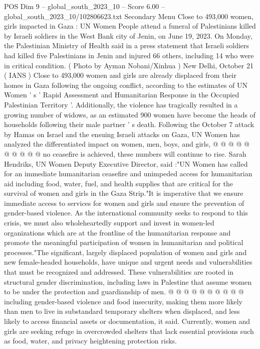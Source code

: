 \begin{textsample}{POS Dim 9 – global\_south\_2023\_10 – Score 6.00 – global\_south\_2023\_10/102806623.txt}  \label{ex:f9_pos_035}
Secondary Menu Close to 493,000 women, girls impacted in Gaza : UN Women People attend a funeral of Palestinians killed by Israeli soldiers in the West Bank city of Jenin, on June 19, 2023.
On Monday, the Palestinian Ministry of Health said in a press statement that Israeli soldiers had killed five Palestinians in Jenin and injured 66 others, including 14 who were in critical condition. ( Photo by Ayman Nobani/Xinhua ) New Delhi, October 21 ( IANS ) Close to 493,000 women and girls are already displaced from their homes in Gaza following the ongoing conflict, according to the estimates of UN Women ' s ' Rapid Assessment and Humanitarian Response in the Occupied Palestinian Territory '.
Additionally, the violence has tragically resulted in a growing number of widows, as an estimated 900 women have become the heads of households following their male partner ' s death.
Following the October 7 attack by Hamas on Israel and the ensuing Israeli attacks on Gaza, UN Women has analyzed the differentiated impact on women, men, boys, and girls, @ @ @ @ @ @ @ @ @ @ no ceasefire is achieved, these numbers will continue to rise.
Sarah Hendriks, UN Women Deputy Executive Director, said :"UN Women has called for an immediate humanitarian ceasefire and unimpeded access for humanitarian aid including food, water, fuel, and health supplies that are critical for the survival of women and girls in the Gaza Strip."It is imperative that we ensure immediate access to services for women and girls and ensure the prevention of gender-based violence.
As the international community seeks to respond to this crisis, we must also wholeheartedly support and invest in women-led organizations which are at the frontline of the humanitarian response and promote the meaningful participation of women in humanitarian and political processes."The significant, largely displaced population of women and girls and new female-headed households, have unique and urgent needs and vulnerabilities that must be recognized and addressed.
These vulnerabilities are rooted in structural gender discrimination, including laws in Palestine that assume women to be under the protection and guardianship of men. @ @ @ @ @ @ @ @ @ @ including gender-based violence and food insecurity, making them more likely than men to live in substandard temporary shelters when displaced, and less likely to access financial assets or documentation, it said.
Currently, women and girls are seeking refuge in overcrowded shelters that lack essential provisions such as food, water, and privacy heightening protection risks.

\end{textsample}
